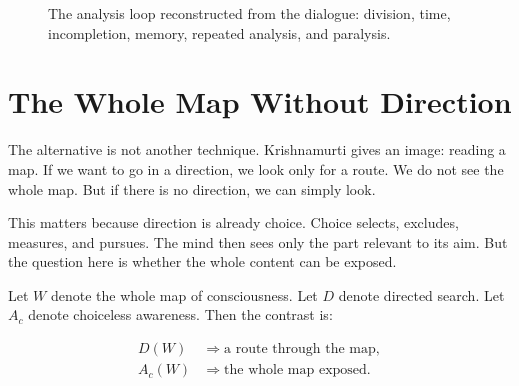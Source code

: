 \begin{figure}
\centering
{}
\caption{The analysis loop reconstructed from the dialogue: division, time, incompletion, memory, repeated analysis, and paralysis.}
\end{figure}

\section{The Whole Map Without Direction}

The alternative is not another technique. Krishnamurti gives an image: reading a map. If we want to go in a direction, we look only for a route. We do not see the whole map. But if there is no direction, we can simply look.

This matters because direction is already choice. Choice selects, excludes, measures, and pursues. The mind then sees only the part relevant to its aim. But the question here is whether the whole content can be exposed.

Let \(W\) denote the whole map of consciousness. Let \(D\) denote directed search. Let \(A_c\) denote choiceless awareness. Then the contrast is:

\begin{align}
D(W) &\Rightarrow \text{a route through the map}, \\
A_c(W) &\Rightarrow \text{the whole map exposed}.
\end{align}

